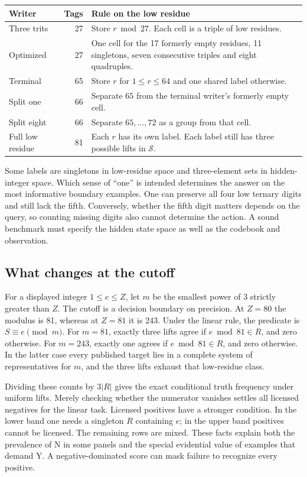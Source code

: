 \documentclass[12pt,letterpaper]{article}
\begin{document}
\begin{center}\small
\begin{tabularx}{\linewidth}{@{}p{.20\linewidth}rL@{}}\toprule
Writer & Tags & Rule on the low residue\\\midrule
Three trits &27& Store $r\bmod27$. Each cell is a triple of low residues.\\
Optimized &27& One cell for the 17 formerly empty residues, 11 singletons, seven consecutive triples and eight quadruples.\\
Terminal &65& Store $r$ for $1\le r\le64$ and one shared label otherwise.\\
Split one &66& Separate $65$ from the terminal writer's formerly empty cell.\\
Split eight &66& Separate $65,\ldots,72$ as a group from that cell.\\
Full low residue &81& Each $r$ has its own label. Each label still has three possible lifts in $\mathcal S$.\\\bottomrule
\end{tabularx}
\end{center}

Some labels are singletons in low-residue space and three-element sets in hidden-integer space. Which sense of ``one'' is intended determines the answer on the most informative boundary examples. One can preserve all four low ternary digits and still lack the fifth. Conversely, whether the fifth digit matters depends on the query, so counting missing digits also cannot determine the action. A sound benchmark must specify the hidden state space as well as the codebook and observation.

\subsection{What changes at the cutoff}
For a displayed integer $1\le e\le Z$, let $m$ be the smallest power of 3 strictly greater than $Z$. The cutoff is a decision boundary on precision. At $Z=80$ the modulus is 81, whereas at $Z=81$ it is 243. Under the linear rule, the predicate is $S\equiv e\pmod m$. For $m=81$, exactly three lifts agree if $e\bmod81\in R$, and zero otherwise. For $m=243$, exactly one agrees if $e\bmod81\in R$, and zero otherwise. In the latter case every published target lies in a complete system of representatives for $m$, and the three lifts exhaust that low-residue class.

Dividing these counts by $3|R|$ gives the exact conditional truth frequency under uniform lifts. Merely checking whether the numerator vanishes settles all licensed negatives for the linear task. Licensed positives have a stronger condition. In the lower band one needs a singleton $R$ containing $e$; in the upper band positives cannot be licensed. The remaining rows are mixed. These facts explain both the prevalence of N in some panels and the special evidential value of examples that demand Y. A negative-dominated score can mask failure to recognize every positive.
\end{document}
